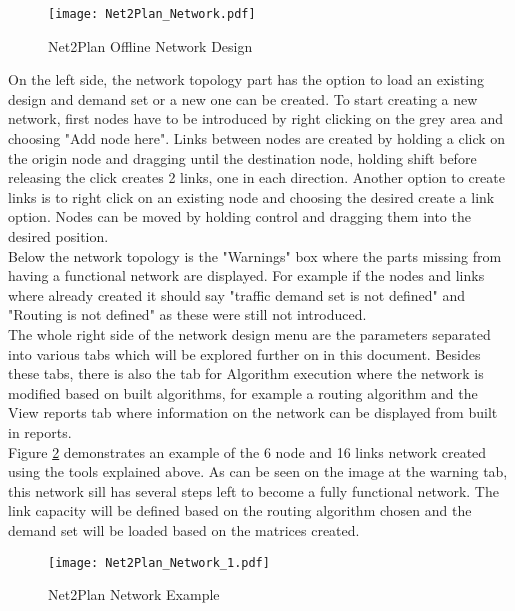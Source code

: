 \documentclass[12pt, a4paper]{article}
\begin{document}
	\begin{figure}[h!]
		\centering
		\texttt{[image: Net2Plan\_Network.pdf]}
		\caption{Net2Plan Offline Network Design}
		\label{Net2Plan_Network}
	\end{figure}
	
	On the left side, the network topology part has the option to load an existing design and demand set or a new one can be created. To start creating a new network, first nodes have to be introduced by right clicking on the grey area and choosing "Add node here". Links between nodes are created by holding a click on the origin node and dragging until the destination node, holding shift before releasing the click creates 2 links, one in each direction. Another option to create links is to right click on an existing node and choosing the desired create a link option. Nodes can be moved by holding control and dragging them into the desired position.\\
	
	Below the network topology is the "Warnings" box where the parts missing from having a functional network are displayed. For example if the nodes and links where already created it should say "traffic demand set is not defined" and "Routing is not defined" as these were still not introduced.\\
	
	The whole right side of the network design menu are the parameters separated into various tabs which will be explored further on in this document. Besides these tabs, there is also the tab for Algorithm execution where the network is modified based on built algorithms, for example a routing algorithm and the View reports tab where information on the network can be displayed from built in reports. \\

	Figure \ref{Net2Plan_Network_1} demonstrates an example of the 6 node and 16 links network created using the tools explained above. As can be seen on the image at the warning tab, this network sill has several steps left to become a fully functional network. The link capacity will be defined based on the routing algorithm chosen and the demand set will be loaded based on the matrices created. \\
		
	\pagebreak
	\begin{figure}[h!]
		\centering
		\texttt{[image: Net2Plan\_Network\_1.pdf]}
		\caption{Net2Plan Network Example}
		\label{Net2Plan_Network_1}
	\end{figure}
\end{document}
